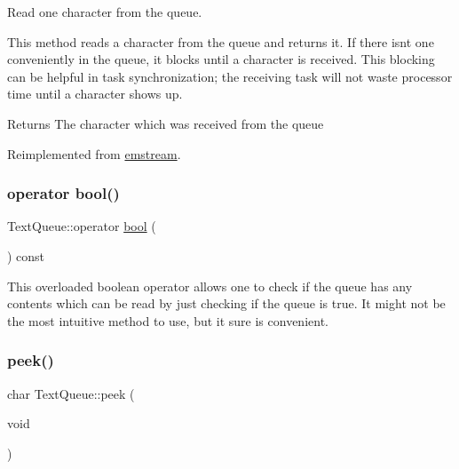 Read one character from the queue. 

This method reads a character from the queue and returns it. If there isn\textquotesingle{}t one conveniently in the queue, it blocks until a character is received. This blocking can be helpful in task synchronization; the receiving task will not waste processor time until a character shows up. \begin{DoxyReturn}{Returns}
The character which was received from the queue 
\end{DoxyReturn}


Reimplemented from \mbox{\hyperlink{classemstream_a41f0814540d5baa7312310c59077a248}{emstream}}.

\mbox{\label{class_text_queue_a0fd3c395a00b5da3bb866137466d878a}} 
\subsubsection{\texorpdfstring{operator bool()}{operator bool()}}
{\footnotesize\ttfamily Text\+Queue\+::operator \mbox{\hyperlink{group___motor___boolean___type_ga0ecf26b576b9a54eca656b9be7ba6a06}{bool}} (\begin{DoxyParamCaption}{ }\end{DoxyParamCaption}) const\hspace{0.3cm}{\ttfamily [inline]}}

This overloaded boolean operator allows one to check if the queue has any contents which can be read by just checking if the queue is true. It might not be the most intuitive method to use, but it sure is convenient. \mbox{\label{class_text_queue_a92ed0a74b86ce1ea2dd426c92f3230c6}} 
\subsubsection{\texorpdfstring{peek()}{peek()}}
{\footnotesize\ttfamily char Text\+Queue\+::peek (\begin{DoxyParamCaption}\item[{void}]{ }\end{DoxyParamCaption})\hspace{0.3cm}{\ttfamily [virtual]}}



